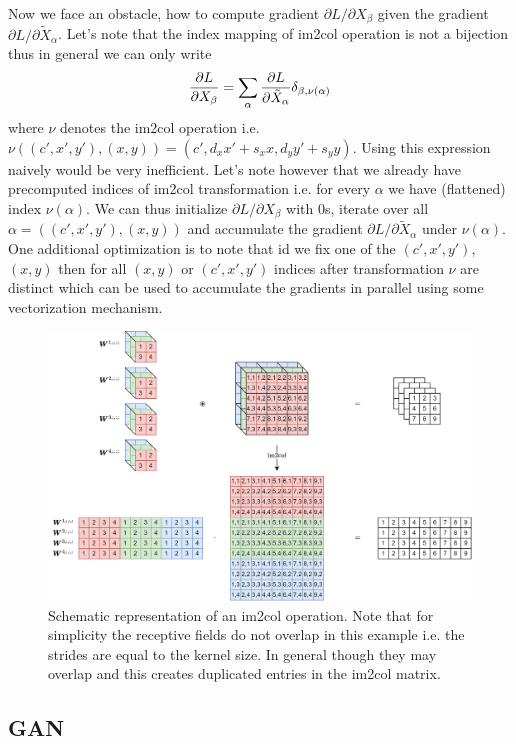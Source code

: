 \documentclass{myclass}
\begin{document}
Now we face an obstacle, how to compute gradient $\partial{L}/\partial{X_{\beta}}$ given the
gradient $\partial{L}/\partial{\tilde{X}_{\alpha}}$. Let's note that the index mapping of im2col
operation is not a bijection thus in general we can only write
\[
   \pdv{L}{X_\beta} = \sum_{\alpha} \pdv{L}{\tilde{X}_\alpha} \delta_{\beta, \nu(\alpha)}
\]
where $\nu$ denotes the im2col operation i.e. $\nu((c',x',y'), (x,y)) = (c', d_xx' + s_xx, d_yy' +
s_yy)$. Using this expression naively would be very inefficient. Let's note however that we already
have precomputed indices of im2col transformation i.e. for every $\alpha$ we have (flattened) index
$\nu(\alpha)$. We can thus initialize $\partial{L}/\partial{X_\beta}$ with 0s, iterate over all
$\alpha = ((c',x',y'), (x,y))$ and accumulate the gradient $\partial{L}/\partial{\tilde{X}_\alpha}$
under $\nu(\alpha)$. One additional optimization is to note that id we fix one of the $(c',x',y')$,
$(x,y)$ then for all $(x,y)$ or $(c',x',y')$ indices after transformation $\nu$ are distinct which
can be used to accumulate the gradients in parallel using some vectorization mechanism.

\begin{figure}[ht]
   \centering
   \includegraphics[width=0.95\columnwidth]{figs/im2col.png}
   \caption{Schematic representation of an im2col operation. Note that for simplicity the receptive 
   fields do not overlap in this example i.e. the strides are equal to the kernel size. In general
   though they may overlap and this creates duplicated entries in the im2col matrix.}
   \label{fig:im2col}
\end{figure}


\subsection{GAN}
\end{document}
